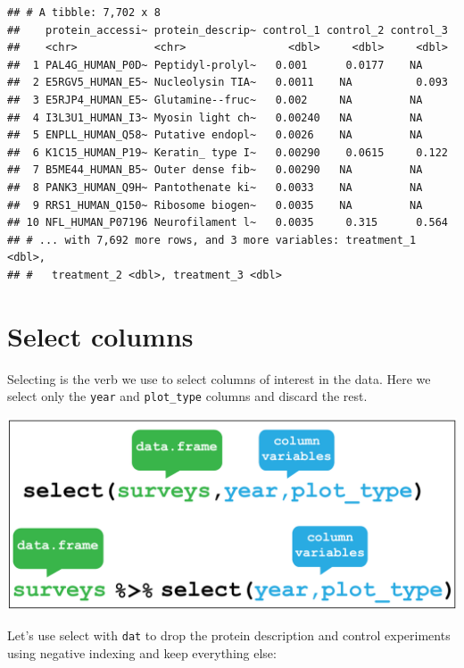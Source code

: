 \documentclass[12pt,]{book}
\newenvironment{Shaded}{\begin{snugshade}}{\end{snugshade}}
\newcommand{\DecValTok}[1]{\textcolor[rgb]{0.00,0.00,0.81}{#1}}
\newcommand{\KeywordTok}[1]{\textcolor[rgb]{0.13,0.29,0.53}{\textbf{#1}}}
\newcommand{\NormalTok}[1]{#1}
\newcommand{\OperatorTok}[1]{\textcolor[rgb]{0.81,0.36,0.00}{\textbf{#1}}}
\newcommand{\StringTok}[1]{\textcolor[rgb]{0.31,0.60,0.02}{#1}}
\begin{document}
\begin{verbatim}
## # A tibble: 7,702 x 8
##    protein_accessi~ protein_descrip~ control_1 control_2 control_3
##    <chr>            <chr>                <dbl>     <dbl>     <dbl>
##  1 PAL4G_HUMAN_P0D~ Peptidyl-prolyl~   0.001      0.0177    NA    
##  2 E5RGV5_HUMAN_E5~ Nucleolysin TIA~   0.0011    NA          0.093
##  3 E5RJP4_HUMAN_E5~ Glutamine--fruc~   0.002     NA         NA    
##  4 I3L3U1_HUMAN_I3~ Myosin light ch~   0.00240   NA         NA    
##  5 ENPLL_HUMAN_Q58~ Putative endopl~   0.0026    NA         NA    
##  6 K1C15_HUMAN_P19~ Keratin_ type I~   0.00290    0.0615     0.122
##  7 B5ME44_HUMAN_B5~ Outer dense fib~   0.00290   NA         NA    
##  8 PANK3_HUMAN_Q9H~ Pantothenate ki~   0.0033    NA         NA    
##  9 RRS1_HUMAN_Q150~ Ribosome biogen~   0.0035    NA         NA    
## 10 NFL_HUMAN_P07196 Neurofilament l~   0.0035     0.315      0.564
## # ... with 7,692 more rows, and 3 more variables: treatment_1 <dbl>,
## #   treatment_2 <dbl>, treatment_3 <dbl>
\end{verbatim}

\hypertarget{select-columns}{%
\section{Select columns}\label{select-columns}}

Selecting is the verb we use to select columns of interest in the data. Here
we select only the \texttt{year} and \texttt{plot\_type} columns and discard the rest.

\begin{center}\includegraphics[width=0.8\linewidth]{img/dplyr_select} \end{center}

Let's use select with \texttt{dat} to drop the protein description and control
experiments using negative indexing and keep everything else:

\begin{Shaded}
\end{Shaded}
\end{document}
